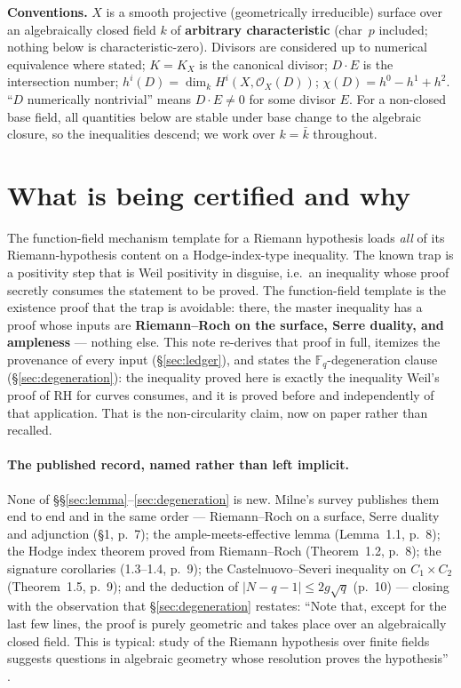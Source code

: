 \documentclass[11pt]{article}
\theoremstyle{definition}
\theoremstyle{remark}
\newcommand{\Fq}{\mathbb{F}_q}
\newcommand{\OX}{\mathcal{O}_X}
\begin{document}
\medskip

\noindent\textbf{Conventions.} $X$ is a smooth projective (geometrically irreducible)
surface over an algebraically closed field $k$ of \textbf{arbitrary characteristic}
(char~$p$ included; nothing below is characteristic-zero). Divisors are considered up to
numerical equivalence where stated; $K = K_X$ is the canonical divisor; $D \cdot E$ is the
intersection number; $h^i(D) = \dim_k H^i(X, \OX(D))$;
$\chi(D) = h^0 - h^1 + h^2$. ``$D$ numerically nontrivial'' means $D \cdot E \ne 0$ for some
divisor $E$. For a non-closed base field, all quantities below are stable under base change
to the algebraic closure, so the inequalities descend; we work over $k = \bar{k}$
throughout.

\section{What is being certified and why}
\label{sec:certified}

The function-field mechanism template for a Riemann hypothesis loads \emph{all} of its
Riemann-hypothesis content on a Hodge-index-type inequality. The known trap is a positivity
step that is Weil positivity in disguise, i.e.\ an inequality whose proof secretly consumes
the statement to be proved. The function-field template is the existence proof that the trap
is avoidable: there, the master inequality has a proof whose inputs are
\textbf{Riemann--Roch on the surface, Serre duality, and ampleness} --- nothing else. This
note re-derives that proof in full, itemizes the provenance of every input
(\S\ref{sec:ledger}), and states the $\Fq$-degeneration clause (\S\ref{sec:degeneration}):
the inequality proved here is exactly the inequality Weil's proof of RH for curves consumes,
and it is proved before and independently of that application. That is the non-circularity
claim, now on paper rather than recalled.

\paragraph{The published record, named rather than left implicit.}
None of \S\S\ref{sec:lemma}--\ref{sec:degeneration} is new. Milne's survey \cite{Milne16}
publishes them end to end and in the same order --- Riemann--Roch on a surface, Serre duality
and adjunction (\S1, p.~7); the ample-meets-effective lemma (Lemma~1.1, p.~8); the Hodge index
theorem proved from Riemann--Roch (Theorem~1.2, p.~8); the signature corollaries (1.3--1.4,
p.~9); the Castelnuovo--Severi inequality on $C_1 \times C_2$ (Theorem~1.5, p.~9); and the
deduction of $|N - q - 1| \le 2g\sqrt{q}$ (p.~10) --- closing with the observation that
\S\ref{sec:degeneration} restates: ``Note that, except for the last few lines, the proof is
purely geometric and takes place over an algebraically closed field. This is typical: study of
the Riemann hypothesis over finite fields suggests questions in algebraic geometry whose
resolution proves the hypothesis'' \cite[Aside~1.8, p.~10]{Milne16}.
\end{document}
